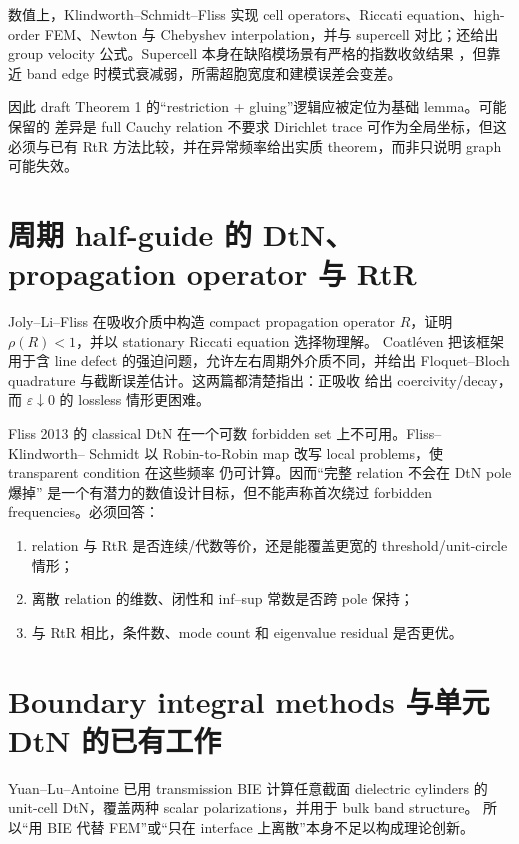 \documentclass[UTF8,11pt,fontset=none]{ctexart}
\begin{document}
数值上，Klindworth--Schmidt--Fliss 实现 cell operators、Riccati equation、high-order
FEM、Newton 与 Chebyshev interpolation，并与 supercell 对比；还给出 group velocity
公式\cite{KlindworthSchmidtFliss2014}。Supercell 本身在缺陷模场景有严格的指数收敛结果
\cite{Soussi2005}，但靠近 band edge 时模式衰减弱，所需超胞宽度和建模误差会变差。

因此 draft Theorem 1 的“restriction + gluing”逻辑应被定位为基础 lemma。可能保留的
差异是 full Cauchy relation 不要求 Dirichlet trace 可作为全局坐标，但这必须与已有 RtR
方法比较，并在异常频率给出实质 theorem，而非只说明 graph 可能失效。

\section{周期 half-guide 的 DtN、propagation operator 与 RtR}

Joly--Li--Fliss 在吸收介质中构造 compact propagation operator \(R\)，证明
\(\rho(R)<1\)，并以 stationary Riccati equation 选择物理解\cite{JolyLiFliss2006}。
Coatléven 把该框架用于含 line defect 的强迫问题，允许左右周期外介质不同，并给出
Floquet--Bloch quadrature 与截断误差估计\cite{Coatleven2012}。这两篇都清楚指出：正吸收
给出 coercivity/decay，而 \(\varepsilon\downarrow0\) 的 lossless 情形更困难。

Fliss 2013 的 classical DtN 在一个可数 forbidden set 上不可用。Fliss--Klindworth--
Schmidt 以 Robin-to-Robin map 改写 local problems，使 transparent condition 在这些频率
仍可计算\cite{FlissKlindworthSchmidt2015}。因而“完整 relation 不会在 DtN pole 爆掉”
是一个有潜力的数值设计目标，但不能声称首次绕过 forbidden frequencies。必须回答：

\begin{enumerate}
  \item relation 与 RtR 是否连续/代数等价，还是能覆盖更宽的 threshold/unit-circle 情形；
  \item 离散 relation 的维数、闭性和 inf--sup 常数是否跨 pole 保持；
  \item 与 RtR 相比，条件数、mode count 和 eigenvalue residual 是否更优。
\end{enumerate}

\section{Boundary integral methods 与单元 DtN 的已有工作}

Yuan--Lu--Antoine 已用 transmission BIE 计算任意截面 dielectric cylinders 的 unit-cell
DtN，覆盖两种 scalar polarizations，并用于 bulk band structure\cite{YuanLuAntoine2008}。
所以“用 BIE 代替 FEM”或“只在 interface 上离散”本身不足以构成理论创新。
\end{document}

